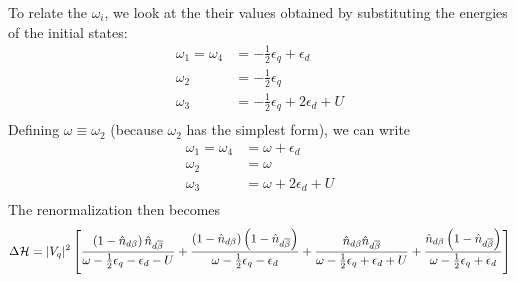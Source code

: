 \documentclass[12pt,twoside]{article}
\numberwithin{equation}{section}
\begin{document}
To relate the \(\omega_i\), we look at the their values obtained by substituting the energies of the initial states:
\begin{equation}\begin{aligned}
	\omega_1 = \omega_4 &= -\frac{1}{2}\epsilon_q + \epsilon_d\\
	\omega_2 &= -\frac{1}{2}\epsilon_q\\
	\omega_3 &= -\frac{1}{2}\epsilon_q + 2\epsilon_d + U\\
\end{aligned}\end{equation}
Defining \(\omega \equiv \omega_2\) (because \(\omega_2\) has the simplest form), we can write
\begin{equation}\begin{aligned}
	\omega_1 = \omega_4 &= \omega + \epsilon_d\\
	\omega_2 &= \omega\\
	\omega_3 &= \omega + 2\epsilon_d + U\\
\end{aligned}\end{equation}
The renormalization then becomes
\begin{equation}\begin{aligned}
	\label{vanilla:siam:ren}
	\Delta \mathcal{H} = |V_q|^2 \left[\frac{\left(1 - \hat n_{d\beta}\right)\hat n_{d\overline\beta}}{\omega - \frac{1}{2}\epsilon_q - \epsilon_d - U} + \frac{\left(1 - \hat n_{d\beta}\right)\left( 1-\hat n_{d\overline\beta} \right)}{\omega - \frac{1}{2}\epsilon_q - \epsilon_d} + \frac{\hat n_{d\beta} \hat n_{d\overline\beta}}{\omega - \frac{1}{2}\epsilon_q + \epsilon_d + U} + \frac{\hat n_{d\beta}\left( 1- \hat n_{d\overline\beta}\right) }{\omega - \frac{1}{2}\epsilon_q + \epsilon_d}\right]
\end{aligned}\end{equation}
\end{document}

